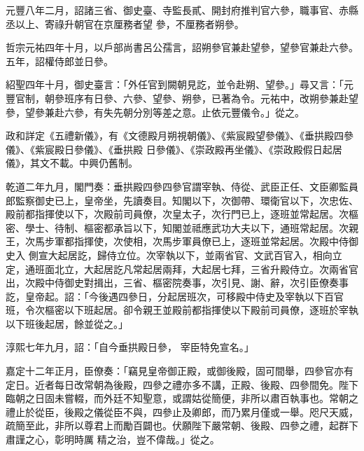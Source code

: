 \begin{pinyinscope}
 元豐八年二月，詔諸三省、御史臺、寺監長貳、開封府推判官六參，職事官、赤縣丞以上、寄祿升朝官在京厘務者望
 參，不厘務者朔參。



 哲宗元祐四年十月，以戶部尚書呂公孺言，詔朔參官兼赴望參，望參官兼赴六參。五年，詔權侍郎並日參。



 紹聖四年十月，御史臺言：「外任官到闕朝見訖，並令赴朔、望參。」尋又言：「元豐官制，朝參班序有日參、六參、望參、朔參，已著為令。元祐中，改朔參兼赴望參，望參兼赴六參，有失先朝分別等差之意。止依元豐儀令。」從之。



 政和詳定《五禮新儀》，有《文德殿月朔視朝儀》、《紫宸殿望參儀》、《垂拱殿四參儀》、《紫宸殿日參儀》、《垂拱殿
 日參儀》、《崇政殿再坐儀》、《崇政殿假日起居儀》，其文不載。中興仍舊制。



 乾道二年九月，閣門奏：垂拱殿四參四參官謂宰執、侍從、武臣正任、文臣卿監員郎監察御史已上，皇帝坐，先讀奏目。知閣以下，次御帶、環衛官以下，次忠佐、殿前都指揮使以下，次殿前司員僚，次皇太子，次行門已上，逐班並常起居。次樞密、學士、待制、樞密都承旨以下，知閣並祗應武功大夫以下，通班常起居。次親王，次馬步軍都指揮使，次使相，次馬步軍員僚已上，逐班並常起居。次殿中侍御史入
 側宣大起居訖，歸侍立位。次宰執以下，並兩省官、文武百官入，相向立定，通班面北立，大起居訖凡常起居兩拜，大起居七拜，三省升殿侍立。次兩省官出，次殿中侍御史對揖出，三省、樞密院奏事，次引見、謝、辭，次引臣僚奏事訖，皇帝起。詔：「今後遇四參日，分起居班次，可移殿中侍史及宰執以下百官班，令次樞密以下班起居。卻令親王並殿前都指揮使以下殿前司員僚，逐班於宰執以下班後起居，餘並從之。」



 淳熙七年九月，詔：「自今垂拱殿日參，
 宰臣特免宣名。」



 嘉定十二年正月，臣僚奏：「竊見皇帝御正殿，或御後殿，固可間舉，四參官亦有定日。近者每日改常朝為後殿，四參之禮亦多不講，正殿、後殿、四參間免。陛下臨朝之日固未嘗輟，而外廷不知聖意，或謂姑從簡便，非所以肅百執事也。常朝之禮止於從臣，後殿之儀從臣不與，四參止及卿郎，而乃累月僅或一舉。咫尺天威，疏簡至此，非所以尊君上而勵百闢也。伏願陛下嚴常朝、後殿、四參之禮，起群下肅謹之心，彰明時厲
 精之治，豈不偉哉。」從之。




\end{pinyinscope}
